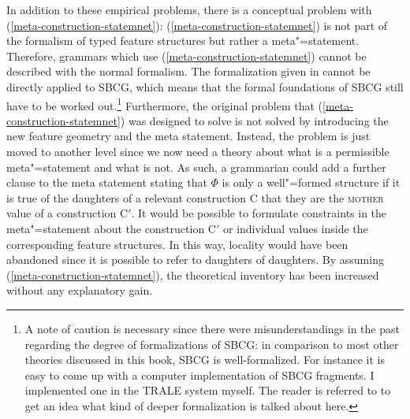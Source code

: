 \largerpage[2]
In addition to these empirical problems, there is a conceptual problem with (\ref{meta-construction-statemnet}):
(\ref{meta-construction-statemnet}) is not part of the formalism of typed feature structures but
rather a meta"=statement.
Therefore,\label{page-sbcg-formalization} grammars which use (\ref{meta-construction-statemnet}) cannot be described with the normal formalism. The formalization given in
\citet{Richter2004a-u} cannot be directly applied to SBCG, which means that the formal foundations
of SBCG still have to be worked out.\footnote{%
  A note of caution is necessary since there were misunderstandings in the past regarding the degree
  of formalizations of SBCG: in comparison to most other theories discussed in this book,
  SBCG is well-formalized. For instance it is easy to come up with a computer implementation of SBCG
  fragments. I implemented one in the TRALE system myself. The reader is referred to \citet{Richter2004a-u} to get an idea what kind
  of deeper formalization is talked about here.
}
Furthermore, the original problem that (\ref{meta-construction-statemnet}) was designed to solve is
not solved by introducing the new feature geometry and the meta statement. Instead, the problem
is just moved to another level since we now need a theory about what is a permissible meta"=statement and what is not. As such, a grammarian
could add a further clause to the meta statement stating that $\Phi$ is only a well"=formed structure if it is true of the daughters of a relevant construction C
that they are the \textsc{mother} value of a construction C$'$. It would be possible to formulate constraints in the meta"=statement about the construction C$'$ or individual
values inside the corresponding feature structures.
In this way, locality would have been abandoned since it is possible to refer to daughters of daughters.
By assuming (\ref{meta-construction-statemnet}), the theoretical inventory has been increased without any explanatory gain.

